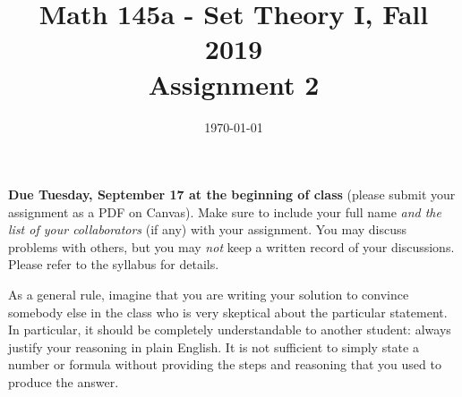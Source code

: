 \documentclass{amsart}
\title[Math 145a, Fall 2019: assignment 2]{Math 145a - Set Theory I, Fall 2019 \\ Assignment 2}
\date{\today}
\theoremstyle{definition}
\begin{document}

\vspace*{-10em}

\maketitle

\textbf{Due Tuesday, September 17 at the beginning of class} (please submit your assignment as a PDF on Canvas). Make sure to include your full name \emph{and the list of your collaborators} (if any) with your assignment. You may discuss problems with others, but you may \emph{not} keep a written record of your discussions. Please refer to the syllabus for details.

As a general rule, imagine that you are writing your solution to convince somebody else in the class who is very skeptical about the particular statement. In particular, it should be completely understandable to another student: always justify your reasoning in plain English. It is not sufficient to simply state a number or formula without providing the steps and reasoning that you used to produce the answer.
\end{document}
